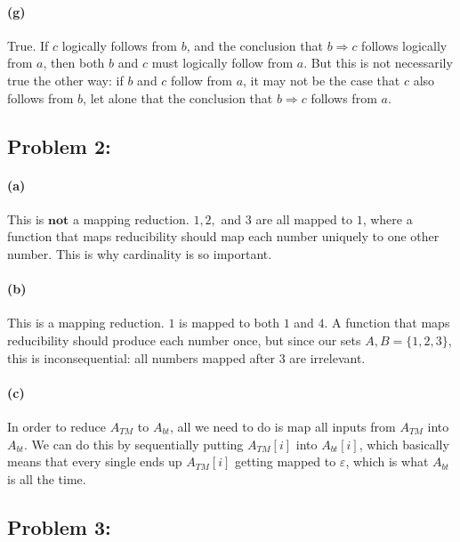 \documentclass[a4paper]{article}
\begin{document}
\paragraph{(g)} True. If $c$ logically follows from $b$, and the conclusion that $b \Rightarrow c$ follows logically from $a$, then both $b$ and $c$ must logically follow from $a$. But this is not necessarily true the other way: if $b$ and $c$ follow from $a$, it may not be the case that $c$ also follows from $b$, let alone that the conclusion that $b \Rightarrow c$ follows from $a$.

\subsection*{Problem 2:}

\paragraph{(a)} This is $\textbf{not}$ a mapping reduction. $1,2,$ and $3$ are all mapped to $1$, where a function that maps reducibility should map each number uniquely to one other number. This is why cardinality is so important.

\paragraph{(b)} This is a mapping reduction. $1$ is mapped to both $1$ and $4$. A function that maps reducibility should produce each number once, but since our sets $A, B = \{1,2,3\}$, this is inconsequential: all numbers mapped after $3$ are irrelevant.

\paragraph{(c)} In order to reduce $A_{TM}$ to $A_{bt}$, all we need to do is map all inputs from $A_{TM}$ into $A_{bt}$. We can do this by sequentially putting $A_{TM}[i]$ into $A_{bt}[i]$, which basically means that every single ends up $A_{TM}[i]$ getting mapped to $\varepsilon$, which is what $A_{bt}$ is all the time.


\subsection*{Problem 3:}
\end{document}
